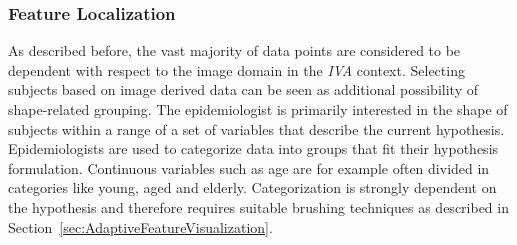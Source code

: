 \documentclass[journal]{style/vgtc} 			          %
\begin{document}


\subsubsection{Feature Localization}
As described before, the vast majority of data points are considered to be dependent with respect to the image domain in the \emph{IVA} context.
%
Selecting subjects based on image derived data can be seen as additional possibility of shape-related grouping.
%
The epidemiologist is primarily interested in the shape of subjects within a range of a set of variables that describe the current hypothesis.
%
Epidemiologists are used to categorize data into groups that fit their hypothesis formulation.
%
Continuous variables such as age are for example often divided in categories like young, aged and elderly.
%
Categorization is strongly dependent on the hypothesis and therefore requires suitable brushing techniques as described in Section~\ref{sec:AdaptiveFeatureVisualization}.
%

\end{document}
